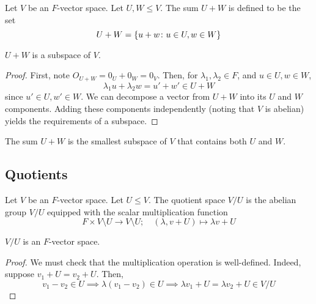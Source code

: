 \begin{definition}
	Let \( V \) be an \( F \)-vector space.
	Let \( U, W \leq V \).
	The sum \( U + W \) is defined to be the set
	\[
		U + W = \qty{ u + w \colon u \in U, w \in W }
	\]
\end{definition}
\begin{proposition}
	\( U + W \) is a subspace of \( V \).
\end{proposition}
\begin{proof}
	First, note \( O_{U+W} = 0_U + 0_W = 0_V \).
	Then, for \( \lambda_1, \lambda_2 \in F \), and \( u \in U, w \in W \),
	\[
		\lambda_1 u + \lambda_2 w = u' + w' \in U + W
	\]
	since \( u' \in U, w' \in W \).
	We can decompose a vector from \( U + W \) into its \( U \) and \( W \) components.
	Adding these components independently (noting that \( V \) is abelian) yields the requirements of a subspace.
\end{proof}
\begin{proposition}
	The sum \( U + W \) is the smallest subspace of \( V \) that contains both \( U \) and \( W \).
\end{proposition}

\subsection{Quotients}
\begin{definition}
	Let \( V \) be an \( F \)-vector space.
	Let \( U \leq V \).
	The quotient space \( V / U \) is the abelian group \( V / U \) equipped with the scalar multiplication function
	\[
		F \times V \setminus U \to V \setminus U;\quad (\lambda, v + U) \mapsto \lambda v + U
	\]
\end{definition}
\begin{proposition}
	\( V / U \) is an \( F \)-vector space.
\end{proposition}
\begin{proof}
	We must check that the multiplication operation is well-defined.
	Indeed, suppose \( v_1 + U = v_2 + U \).
	Then,
	\[
		v_1 - v_2 \in U \implies \lambda (v_1 - v_2) \in U \implies \lambda v_1 + U = \lambda v_2 + U \in V / U
	\]
\end{proof}

